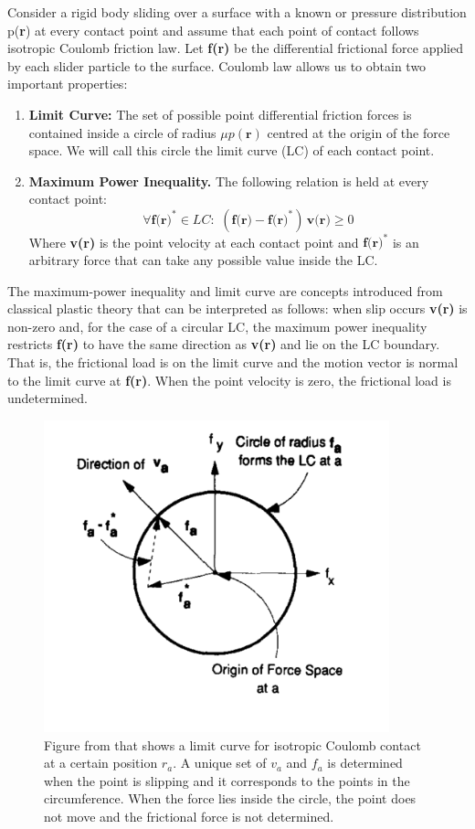 \documentclass[12,twoside]{TFG-GM}
\theoremstyle{definition}
\theoremstyle{remark}
\begin{document}
Consider a rigid body sliding over a surface with a known or pressure distribution p(\textbf{r}) at every contact point and assume that each point of contact follows isotropic Coulomb friction law. Let \textbf{f(r)} be the differential frictional force applied by each slider particle to the surface. Coulomb law allows us to obtain two important properties:
\begin{enumerate}
\item {\textbf{Limit Curve:}} The set of possible point differential friction forces is contained inside a circle of radius $\mu  p(\textbf{r})$ centred at the origin of the force space. We will call this circle the limit curve (LC) of each contact point.
\item {\textbf{Maximum Power Inequality. }} The following relation is held at every contact point:
$$ \forall \textbf{f(r)}^* \in LC: \,\, (\textbf{f(r)} - \textbf{f(r)}^*)\, \textbf{v(r)} \geq 0 $$
Where \textbf{v(r)} is the point velocity at each contact point and $\textbf{f(r)}^*$ is an arbitrary force that can take any possible value inside the LC.
\end{enumerate}

The maximum-power inequality and limit curve are concepts introduced from classical plastic theory that can be interpreted as follows: when slip occurs \textbf{v(r)} is non-zero and, for the case of a circular LC, the maximum power inequality restricts \textbf{f(r)} to have the same direction as \textbf{v(r)} and lie on the LC boundary. That is, the frictional load is on the limit curve and the motion vector is normal to the limit curve at \textbf{f(r)}. When the point velocity is zero, the frictional load is undetermined.

\begin{figure}[htb!]
\begin{center}
\includegraphics[width=10cm]{isotropic_lc.png}
\end{center}
\caption[test caption]{\label{fig:iso_lc} \small{Figure from \protect\cite{planar_sliding1} that shows a limit curve for isotropic Coulomb contact at a certain position \textbf{$r_a$}. A unique set of \textbf{$v_a$} and \textbf{$f_a$} is determined when the point is slipping and it corresponds to the points in the circumference. When the force lies inside the circle, the point does not move and the frictional force is not determined.}}
\end{figure}
\end{document}
